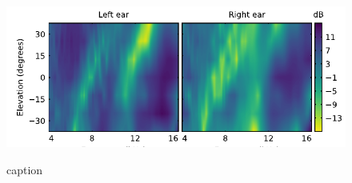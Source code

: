 \begin{figure}[hb]
{\includegraphics[width=13cm]{../Results/figures/fig1/fig1}}
{\caption{caption}\label{fig:test}}
\end{figure}
